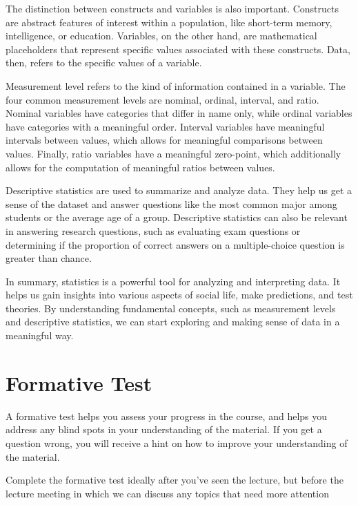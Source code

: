 \documentclass[
  letterpaper,
]{scrbook}
\begin{document}
The distinction between constructs and variables is also important.
Constructs are abstract features of interest within a population, like
short-term memory, intelligence, or education. Variables, on the other
hand, are mathematical placeholders that represent specific values
associated with these constructs. Data, then, refers to the specific
values of a variable.

Measurement level refers to the kind of information contained in a
variable. The four common measurement levels are nominal, ordinal,
interval, and ratio. Nominal variables have categories that differ in
name only, while ordinal variables have categories with a meaningful
order. Interval variables have meaningful intervals between values,
which allows for meaningful comparisons between values. Finally, ratio
variables have a meaningful zero-point, which additionally allows for
the computation of meaningful ratios between values.

Descriptive statistics are used to summarize and analyze data. They help
us get a sense of the dataset and answer questions like the most common
major among students or the average age of a group. Descriptive
statistics can also be relevant in answering research questions, such as
evaluating exam questions or determining if the proportion of correct
answers on a multiple-choice question is greater than chance.

In summary, statistics is a powerful tool for analyzing and interpreting
data. It helps us gain insights into various aspects of social life,
make predictions, and test theories. By understanding fundamental
concepts, such as measurement levels and descriptive statistics, we can
start exploring and making sense of data in a meaningful way.


\hypertarget{formative-test}{%
\chapter{Formative Test}\label{formative-test}}

A formative test helps you assess your progress in the course, and helps
you address any blind spots in your understanding of the material. If
you get a question wrong, you will receive a hint on how to improve your
understanding of the material.

Complete the formative test ideally after you've seen the lecture, but
before the lecture meeting in which we can discuss any topics that need
more attention
\end{document}
